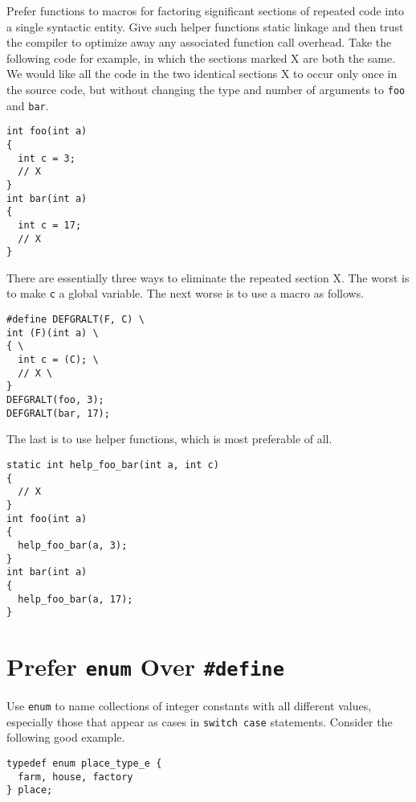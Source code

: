 \documentclass{lulu}
\newcommand{\code}[1]{\texttt{#1}\xspace}
\begin{document}
Prefer functions to macros for factoring significant sections of
repeated code into a single syntactic entity.  Give such helper
functions static linkage and then trust the compiler to optimize away
any associated function call overhead.  Take the following code for
example, in which the sections marked X are both the same.  We would
like all the code in the two identical sections X to occur only once
in the source code, but without changing the type and number of
arguments to \code{foo} and \code{bar}.

\begin{samepage}
\begin{verbatim}
int foo(int a)
{
  int c = 3;
  // X
}
int bar(int a)
{
  int c = 17;
  // X
}
\end{verbatim}
\end{samepage}

There are essentially three ways to eliminate the repeated section X.
The worst is to make \code{c} a global variable.  The next worse is to
use a macro as follows.

\begin{samepage}
\begin{verbatim}
#define DEFGRALT(F, C) \
int (F)(int a) \
{ \
  int c = (C); \
  // X \
}
DEFGRALT(foo, 3);
DEFGRALT(bar, 17);
\end{verbatim}
\end{samepage}

The last is to use helper functions, which is most preferable of all.

\begin{samepage}
\begin{verbatim}
static int help_foo_bar(int a, int c)
{
  // X
}
int foo(int a)
{
  help_foo_bar(a, 3);
}
int bar(int a)
{
  help_foo_bar(a, 17);
}
\end{verbatim}
\end{samepage}

\section{Prefer \code{enum} Over \code{\#define}}

Use \code{enum} to name collections of integer constants with all
different values, especially those that appear as cases in
\code{switch case} statements.  Consider the following good example.

\begin{samepage}
\begin{verbatim}
typedef enum place_type_e { 
  farm, house, factory 
} place;
\end{verbatim}
\end{samepage}
\end{document}
